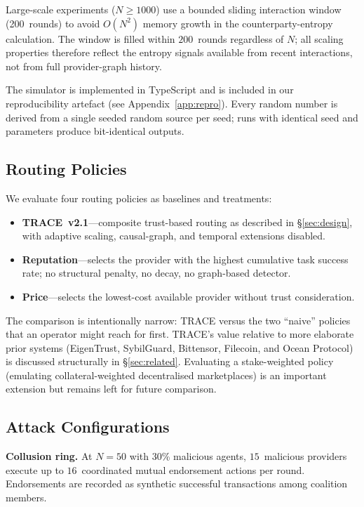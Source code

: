 \documentclass[sigconf,nonacm,10pt]{acmart}
\begin{document}
Large-scale experiments ($N \geq 1000$) use a bounded sliding
interaction window (200~rounds) to avoid $O(N^2)$ memory growth
in the counterparty-entropy calculation. The window is filled
within $200$~rounds regardless of $N$; all scaling properties
therefore reflect the entropy signals available from recent
interactions, not from full provider-graph history.

The simulator is implemented in TypeScript and is included in our
reproducibility artefact (see Appendix~\ref{app:repro}). Every
random number is derived from a single seeded random source per
seed; runs with identical seed and parameters produce
bit-identical outputs.

\subsection{Routing Policies}

We evaluate four routing policies as baselines and treatments:

\begin{itemize}[leftmargin=*,topsep=2pt,itemsep=2pt]
  \item \textbf{TRACE~v2.1}---composite trust-based routing as
        described in \S\ref{sec:design}, with adaptive scaling,
        causal-graph, and temporal extensions disabled.
  \item \textbf{Reputation}---selects the provider with the
        highest cumulative task success rate; no structural
        penalty, no decay, no graph-based detector.
  \item \textbf{Price}---selects the lowest-cost available
        provider without trust consideration.
\end{itemize}

The comparison is intentionally narrow: TRACE versus the two
``naive'' policies that an operator might reach for first.
TRACE's value relative to more elaborate prior systems
(EigenTrust, SybilGuard, Bittensor, Filecoin, and Ocean Protocol) is
discussed structurally in \S\ref{sec:related}. Evaluating a stake-weighted
policy (emulating collateral-weighted decentralised marketplaces)
is an important extension but remains left for future comparison.

\subsection{Attack Configurations}

\noindent\textbf{Collusion ring.}
At $N{=}50$ with 30\% malicious agents, $15$~malicious providers
execute up to $16$~coordinated mutual endorsement actions per
round. Endorsements are recorded as synthetic successful
transactions among coalition members.
\end{document}

